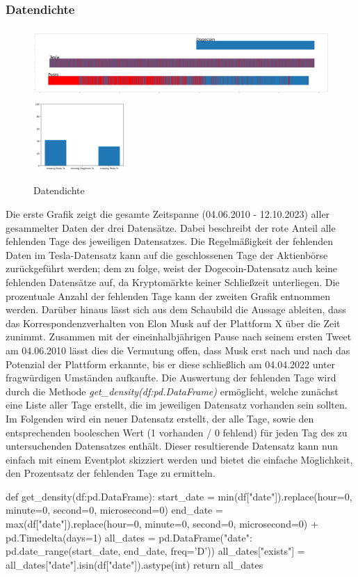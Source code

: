 \documentclass{article}
\begin{document}
\subsubsection{Datendichte}
\begin{figure}[!htb]
  	\includegraphics[width=.7\textwidth, height=100px]{../imgs/Dichte1.png}
	\includegraphics[width=.3\textwidth, height=100px]{../imgs/Dichte2.png}
 	\caption{Datendichte}
 	\label{fig:Datendichte}
\end{figure}
Die erste Grafik zeigt die gesamte Zeitspanne (04.06.2010 - 12.10.2023) aller gesammelter Daten der drei Datensätze. Dabei beschreibt der rote Anteil alle fehlenden Tage des jeweiligen Datensatzes. Die Regelmäßigkeit der fehlenden Daten im Tesla-Datensatz kann auf die geschlossenen Tage der Aktienbörse zurückgeführt werden; dem zu folge, weist der Dogecoin-Datensatz auch keine fehlenden Datensätze auf, da Kryptomärkte keiner Schließzeit unterliegen.
Die prozentuale Anzahl der fehlenden Tage kann der zweiten Grafik entnommen werden. Darüber hinaus lässt sich aus dem Schaubild die Aussage ableiten, dass das Korrespondenzverhalten von Elon Musk auf der Plattform X über die Zeit zunimmt. Zusammen mit der eineinhalbjährigen Pause nach seinem ersten Tweet am 04.06.2010 lässt dies die Vermutung offen, dass Musk erst nach und nach das Potenzial der Plattform erkannte, bis er diese schließlich am 04.04.2022 unter fragwürdigen Umständen aufkaufte. 
Die Auswertung der fehlenden Tage wird durch die Methode \textit{get\_density(df:pd.DataFrame)} ermöglicht, welche zunächst eine Liste aller Tage erstellt, die im jeweiligen Datensatz vorhanden sein sollten. Im Folgenden wird ein neuer Datensatz erstellt, der alle Tage, sowie den entsprechenden booleschen Wert (1 vorhanden / 0 fehlend) für jeden Tag des zu untersuchenden Datensatzes enthält. Dieser resultierende Datensatz kann nun einfach mit einem Eventplot skizziert werden und bietet die einfache Möglichkeit, den Prozentsatz der fehlenden Tage zu ermitteln.
\begin{python}
def get_density(df:pd.DataFrame):
    start_date = min(df["date"]).replace(hour=0, minute=0, second=0, microsecond=0)
    end_date = max(df["date"]).replace(hour=0, minute=0, second=0, microsecond=0) + pd.Timedelta(days=1)
    all_dates = pd.DataFrame({"date": pd.date_range(start_date, end_date, freq='D')})
    all_dates["exists"] = all_dates["date"].isin(df["date"]).astype(int)
    return all_dates
\end{python}
\end{document}
